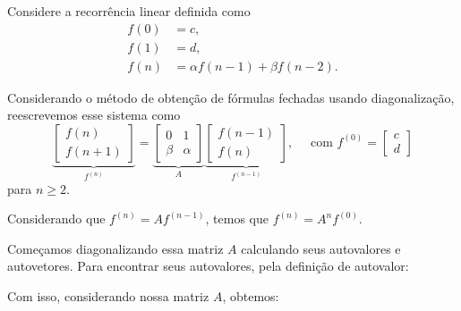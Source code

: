 
Considere a recorrência linear definida como
\begin{align*}
  f(0) &= c, \\
  f(1) &= d, \\
  f(n) &= \alpha f(n-1) + \beta f(n-2).
\end{align*}

Considerando o método de obtenção de fórmulas fechadas usando diagonalização, reescrevemos esse sistema como
\[
  \underbrace{\begin{bmatrix}
    f(n) \\
    f(n+1)
  \end{bmatrix}}_{f^{(n)}}
  =
  \underbrace{\begin{bmatrix}
    0 & 1 \\
    \beta & \alpha
  \end{bmatrix}}_{A}
  \underbrace{\begin{bmatrix}
    f(n-1) \\
    f(n)
  \end{bmatrix}}_{f^{(n-1)}},
  \quad
  \text{ com }
  f^{(0)}
  =
  \begin{bmatrix}
    c \\
    d
  \end{bmatrix}
\]
para $n \geq 2$.

Considerando que $f^{(n)} = A f^{(n-1)}$, temos que $f^{(n)} = A^{n} f^{(0)}$.

Começamos diagonalizando essa matriz $A$ calculando seus autovalores e autovetores. Para encontrar seus autovalores, pela definição de autovalor:
\begin{calcproof}[.]
\end{calcproof}

Com isso, considerando nossa matriz $A$, obtemos:
\begin{calcproof}[.]
\end{calcproof}

